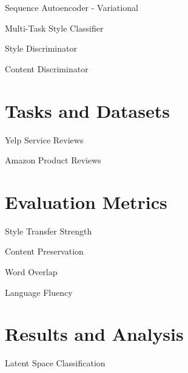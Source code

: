 \documentclass[aspectratio=169]{beamer}
\begin{document}
\begin{frame}{Sequence Autoencoder - Variational}
	\citet{kingma2013auto}
\end{frame}

\begin{frame}{Multi-Task Style Classifier}
\end{frame}

\begin{frame}{Style Discriminator}
\end{frame}

\begin{frame}{Content Discriminator}
\end{frame}

% 

\section{Tasks and Datasets}

\begin{frame}{Yelp Service Reviews}
\end{frame}

\begin{frame}{Amazon Product Reviews}
\end{frame}

% 

\section{Evaluation Metrics}

\begin{frame}{Style Transfer Strength}
\end{frame}

\begin{frame}{Content Preservation}
\end{frame}

\begin{frame}{Word Overlap}
\end{frame}

\begin{frame}{Language Fluency}
\end{frame}

% 

\section{Results and Analysis}

\begin{frame}{Latent Space Classification}
\end{frame}
\end{document}

